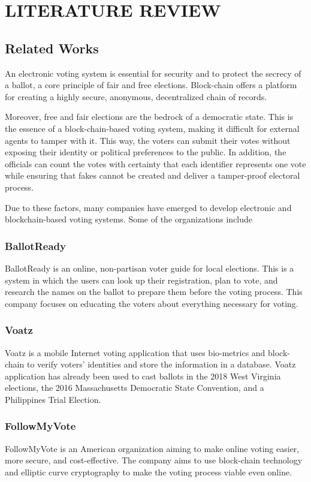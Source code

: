 \documentclass[a4paper,12pt]{report}
\begin{document}
\chapter{LITERATURE REVIEW}
\section{Related Works}
An electronic voting system is essential for security and to protect the secrecy of a ballot, a core principle of fair and free elections. Block-chain offers a platform for creating a highly secure, anonymous, decentralized chain of records.

Moreover, free and fair elections are the bedrock of a democratic state. This is the essence of a block-chain-based voting system, making it difficult for external agents to tamper with it. This way, the voters can submit their votes without exposing their identity or political preferences to the public. In addition, the officials can count the votes with certainty that each identifier represents one vote while ensuring that fakes cannot be created and deliver a tamper-proof electoral process.

Due to these factors, many companies have emerged to develop electronic and blockchain-based voting systems. Some of the organizations include

\subsection{BallotReady}
BallotReady is an online, non-partisan voter guide for local elections. This is a system in which the users can look up their registration, plan to vote, and research the names on the ballot to prepare them before the voting process. This company focuses on educating the voters about everything necessary for voting.

\subsection{Voatz}
Voatz is a mobile Internet voting application that uses bio-metrics and block-chain to verify voters' identities and store the information in a database. Voatz application has already been used to cast ballots in the 2018 West Virginia elections, the 2016 Massachusetts Democratic State Convention, and a Philippines Trial Election.

\subsection{FollowMyVote}
FollowMyVote is an American organization aiming to make online voting easier, more secure, and cost-effective. The company aims to use block-chain technology and elliptic curve cryptography to make the voting process viable even online.
\end{document}
